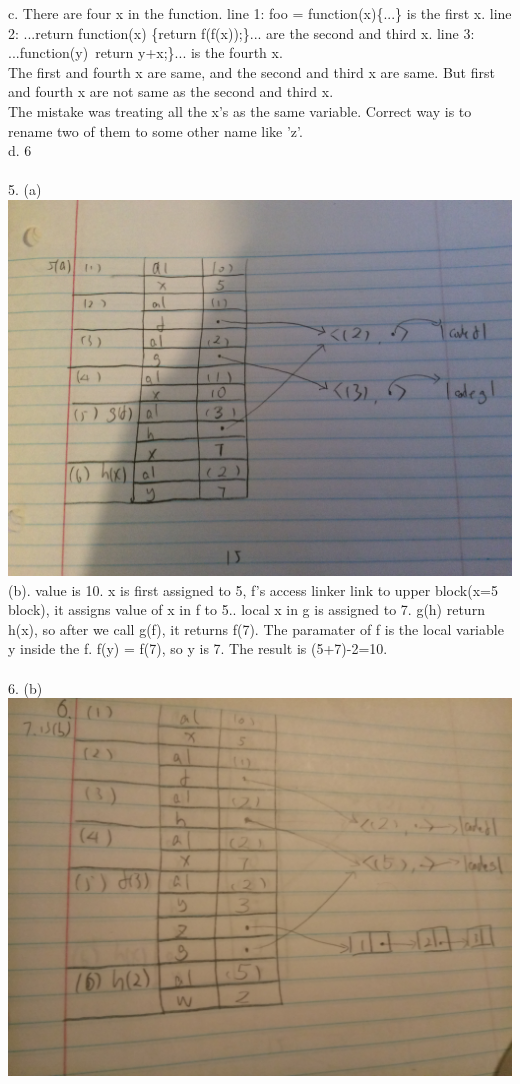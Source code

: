 \documentclass[12pt]{article}
\begin{document}
c. There are four x in the function. line 1: foo = function(x)\{...\} is the first x. line 2: ...return function(x) \{return f(f(x));\}... are the second and third x. line 3: ...function(y)\ {return y+x;\}... is the fourth x.\\
The first and fourth x are same, and the second and third x are same. But first and fourth x are not same as the second and third x.\\
The mistake was treating all the x's as the same variable. Correct way is to rename two of them to some other name like 'z'.\\
d. 6\\
\vspace{1mm}\\
5. (a)\\
\includegraphics[width=\textwidth]{5a.jpg}
(b). value is 10. x is first assigned to 5, f's access linker link to upper block(x=5 block), it assigns value of x in f to 5.. local x in g is assigned to 7. g(h) return h(x), so after we call g(f), it returns f(7). The paramater of f is the local variable y inside the f. f(y) = f(7), so y is 7. The result is (5+7)-2=10.\\ 
\vspace{1mm}\\
6. (b)\\
\includegraphics[width=\textwidth]{6b.jpg}
}
\end{document}
